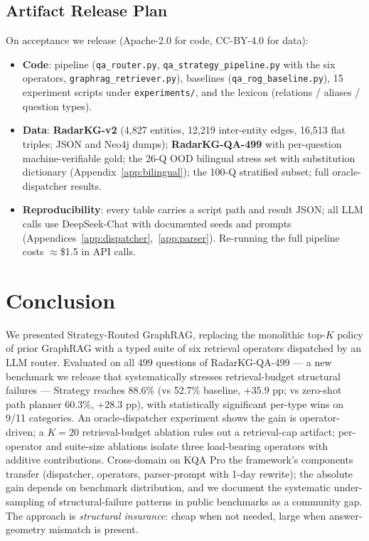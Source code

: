 \documentclass[11pt,a4paper]{article}
\begin{document}
\subsection{Artifact Release Plan}
\label{sec:artifact}

On acceptance we release (Apache-2.0 for code, CC-BY-4.0 for data):
\begin{itemize}[topsep=0pt,itemsep=0pt,leftmargin=*]
  \item \textbf{Code}: pipeline (\texttt{qa\_router.py}, \texttt{qa\_strategy\_pipeline.py} with the six operators, \texttt{graphrag\_retriever.py}), baselines (\texttt{qa\_rog\_baseline.py}), 15 experiment scripts under \texttt{experiments/}, and the lexicon (relations / aliases / question types).
  \item \textbf{Data}: \textbf{RadarKG-v2} (4{,}827 entities, 12{,}219 inter-entity edges, 16{,}513 flat triples; JSON and Neo4j dumps); \textbf{RadarKG-QA-499} with per-question machine-verifiable gold; the 26-Q OOD bilingual stress set with substitution dictionary (Appendix~\ref{app:bilingual}); the 100-Q stratified subset; full oracle-dispatcher results.
  \item \textbf{Reproducibility}: every table carries a script path and result JSON; all LLM calls use DeepSeek-Chat with documented seeds and prompts (Appendices~\ref{app:dispatcher},~\ref{app:parser}). Re-running the full pipeline costs ${\approx}$\$1.5 in API calls.
\end{itemize}

\section{Conclusion}
\label{sec:conclusion}

We presented Strategy-Routed GraphRAG, replacing the monolithic top-$K$ policy of prior GraphRAG with a typed suite of six retrieval operators dispatched by an LLM router. Evaluated on all 499 questions of RadarKG-QA-499 --- a new benchmark we release that systematically stresses retrieval-budget structural failures --- Strategy reaches 88.6\% (vs 52.7\% baseline, $+35.9$ pp; vs zero-shot path planner 60.3\%, $+28.3$ pp), with statistically significant per-type wins on 9/11 categories. An oracle-dispatcher experiment shows the gain is operator-driven; a $K\!=\!20$ retrieval-budget ablation rules out a retrieval-cap artifact; per-operator and suite-size ablations isolate three load-bearing operators with additive contributions. Cross-domain on KQA Pro the framework's components transfer (dispatcher, operators, parser-prompt with 1-day rewrite); the absolute gain depends on benchmark distribution, and we document the systematic under-sampling of structural-failure patterns in public benchmarks as a community gap. The approach is \emph{structural insurance}: cheap when not needed, large when answer-geometry mismatch is present.
\end{document}

